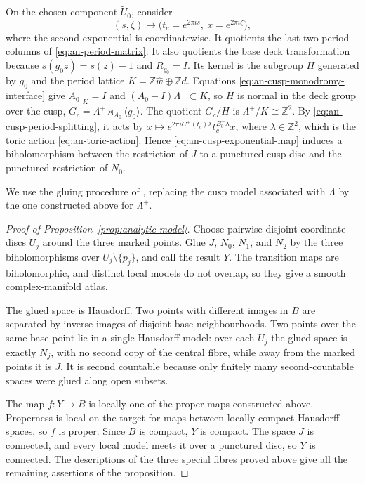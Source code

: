\documentclass[11pt]{article}
\theoremstyle{definition}
\theoremstyle{remark}
\numberwithin{equation}{section}
\newcommand{\ZZ}{\mathbb Z}
\begin{document}
On the chosen component $\widetilde U_0$, consider
\begin{equation}\label{eq:an-cusp-exponential-map}
 (s,\zeta)\longmapsto
 \bigl(t_c=e^{2\pi is},\ x=e^{2\pi i\zeta}\bigr),
\end{equation}
where the second exponential is coordinatewise.  It quotients the last two
period columns of \eqref{eq:an-period-matrix}.  It also quotients the base
deck transformation because $s(g_0z)=s(z)-1$ and
$R_{g_0}=I$.  Its kernel is the subgroup $H$ generated
by $g_0$ and the period lattice
$K=\mathbb Z\widehat w\oplus\mathbb Zd$.  Equations
\eqref{eq:an-cusp-monodromy-interface} give
$A_0|_K=I$ and $(A_0-I)\Lambda^+\subset K$, so $H$ is normal in the
deck group over the cusp,
$G_c=\Lambda^+\rtimes_{A_0}\langle g_0\rangle$.  The quotient
$G_c/H$ is $\Lambda^+/K\cong\mathbb Z^2$.  By
\eqref{eq:an-cusp-period-splitting}, it acts by
$x\longmapsto e^{2\pi iC^+(t_c)\lambda}
t_c^{B_0^+\lambda}x$, where $\lambda\in\ZZ^2$,
which is the toric action \eqref{eq:an-toric-action}.  Hence
\eqref{eq:an-cusp-exponential-map} induces a biholomorphism between the
restriction of $J$ to a punctured cusp disc and the punctured restriction
of $N_0$.

We use the gluing procedure of \citep[Construction~6.1]{Alpoge2026},
replacing the cusp model associated with $\Lambda$ by the one constructed
above for $\Lambda^+$.

\begin{proof}[Proof of Proposition~\ref{prop:analytic-model}]
Choose pairwise disjoint coordinate discs $U_j$ around the three marked
points.  Glue $J$, $N_0$, $N_1$, and $N_2$ by the three
biholomorphisms over $U_j\setminus\{p_j\}$, and call the result
$Y$.  The transition maps are biholomorphic, and distinct local models do
not overlap, so they give a smooth complex-manifold atlas.

The glued space is Hausdorff.  Two points with different images in $B$
are separated by inverse images
of disjoint base neighbourhoods.  Two points over the same base point lie
in a single Hausdorff model: over each $U_j$ the glued space is exactly
$N_j$, with no second copy of the central fibre, while away from the
marked points it is $J$.  It is second countable because only finitely many
second-countable spaces were glued along open subsets.

The map $f:Y\to B$ is locally one of the proper maps constructed above.
Properness is local on the target for maps between locally compact
Hausdorff spaces, so $f$ is proper.  Since $B$ is compact, $Y$ is
compact.  The space $J$ is connected, and every local model meets it over a
punctured disc, so $Y$ is connected.  The descriptions of the three
special fibres proved above give all the remaining assertions of the
proposition.
\end{proof}
\end{document}
